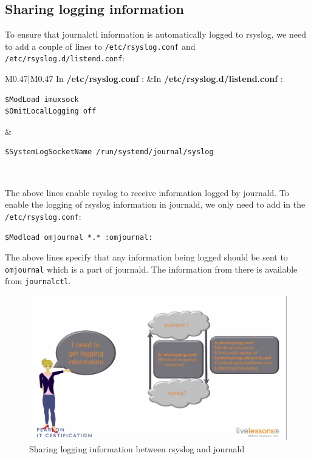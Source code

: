 \subsection{Sharing logging information}	
To ensure that journalctl information is automatically logged to rsyslog, we need to add a couple of lines to \verb|/etc/rsyslog.conf| and \verb|/etc/rsyslog.d/listend.conf|:

\noindent
\begin{tabular}{M{0.47}|M{0.47}}
	\toprule
	In \textbf{/etc/rsyslog.conf} : &In \textbf{/etc/rsyslog.d/listend.conf} : \\
	\midrule
	\begin{minipage}{\linewidth}
		\begin{verbatim}
$ModLoad imuxsock
$OmitLocalLogging off
		\end{verbatim}
		\vspace{-10pt}
	\end{minipage}
	
	&\begin{minipage}{\linewidth}
		\begin{verbatim}
$SystemLogSocketName /run/systemd/journal/syslog
		\end{verbatim}
		\vspace{-10pt}
	\end{minipage}
	\\
	\bottomrule
\end{tabular}

\noindent
The above lines enable rsyslog to receive information logged by journald. To enable the logging of rsyslog information in journald, we only need to add in the \verb|/etc/rsyslog.conf|:

\vspace{-15pt}
\begin{verbatim}
$Modload omjournal *.* :omjournal:
\end{verbatim}
\vspace{-10pt}

\noindent
The above lines specify that any information being logged should be sent to \verb|omjournal| which is a part of journald. The information from there is available from \verb|journalctl|.

\begin{figure}[H]
	\centering
	\includegraphics[width=0.9\linewidth]{RHCSA/Mod2/chapters/2.14.b}
	\caption{Sharing logging information between rsyslog and journald}
	\label{fig:2 Sharing logging information}
\end{figure}

